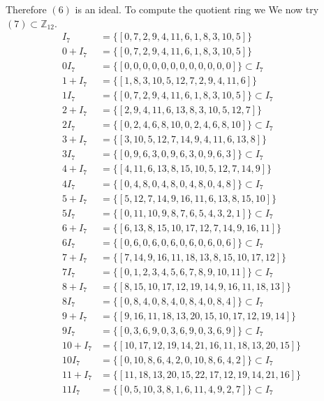 \documentclass[11pt]{amsart}
\begin{document}
Therefore $(6)$ is an ideal.
To compute the quotient ring we
We now try $(7) \subset \mathbb{Z}_{12}$.
\begin{equation*}
\begin{aligned}
I_7 &= \{[0, 7, 2, 9, 4, 11, 6, 1, 8, 3, 10, 5]\} \\
0+ I_7 &= \{[0, 7, 2, 9, 4, 11, 6, 1, 8, 3, 10, 5]\}\\
0 I_7 &= \{[0, 0, 0, 0, 0, 0, 0, 0, 0, 0, 0, 0]\} \subset I_7 \\
1+ I_7 &= \{[1, 8, 3, 10, 5, 12, 7, 2, 9, 4, 11, 6]\}\\
1 I_7 &= \{[0, 7, 2, 9, 4, 11, 6, 1, 8, 3, 10, 5]\} \subset I_7 \\
2+ I_7 &= \{[2, 9, 4, 11, 6, 13, 8, 3, 10, 5, 12, 7]\}\\
2 I_7 &= \{[0, 2, 4, 6, 8, 10, 0, 2, 4, 6, 8, 10]\} \subset I_7 \\
3+ I_7 &= \{[3, 10, 5, 12, 7, 14, 9, 4, 11, 6, 13, 8]\}\\
3 I_7 &= \{[0, 9, 6, 3, 0, 9, 6, 3, 0, 9, 6, 3]\} \subset I_7 \\
4+ I_7 &= \{[4, 11, 6, 13, 8, 15, 10, 5, 12, 7, 14, 9]\}\\
4 I_7 &= \{[0, 4, 8, 0, 4, 8, 0, 4, 8, 0, 4, 8]\} \subset I_7 \\
5+ I_7 &= \{[5, 12, 7, 14, 9, 16, 11, 6, 13, 8, 15, 10]\}\\
5 I_7 &= \{[0, 11, 10, 9, 8, 7, 6, 5, 4, 3, 2, 1]\} \subset I_7 \\
6+ I_7 &= \{[6, 13, 8, 15, 10, 17, 12, 7, 14, 9, 16, 11]\}\\
6 I_7 &= \{[0, 6, 0, 6, 0, 6, 0, 6, 0, 6, 0, 6]\} \subset I_7 \\
7+ I_7 &= \{[7, 14, 9, 16, 11, 18, 13, 8, 15, 10, 17, 12]\}\\
7 I_7 &= \{[0, 1, 2, 3, 4, 5, 6, 7, 8, 9, 10, 11]\} \subset I_7 \\
8+ I_7 &= \{[8, 15, 10, 17, 12, 19, 14, 9, 16, 11, 18, 13]\}\\
8 I_7 &= \{[0, 8, 4, 0, 8, 4, 0, 8, 4, 0, 8, 4]\} \subset I_7 \\
9+ I_7 &= \{[9, 16, 11, 18, 13, 20, 15, 10, 17, 12, 19, 14]\}\\
9 I_7 &= \{[0, 3, 6, 9, 0, 3, 6, 9, 0, 3, 6, 9]\} \subset I_7 \\
10+ I_7 &= \{[10, 17, 12, 19, 14, 21, 16, 11, 18, 13, 20, 15]\}\\
10 I_7 &= \{[0, 10, 8, 6, 4, 2, 0, 10, 8, 6, 4, 2]\} \subset I_7 \\
11+ I_7 &= \{[11, 18, 13, 20, 15, 22, 17, 12, 19, 14, 21, 16]\}\\
11 I_7 &= \{[0, 5, 10, 3, 8, 1, 6, 11, 4, 9, 2, 7]\} \subset I_7 \\
\end{aligned}
\end{equation*}
\end{document}
